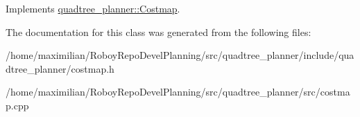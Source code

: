 Implements \hyperlink{classquadtree__planner_1_1Costmap_aba601c58933da74c707214d4dba2925a}{quadtree\+\_\+planner\+::\+Costmap}.



The documentation for this class was generated from the following files\+:\begin{DoxyCompactItemize}
\item 
/home/maximilian/\+Roboy\+Repo\+Devel\+Planning/src/quadtree\+\_\+planner/include/quadtree\+\_\+planner/costmap.\+h\item 
/home/maximilian/\+Roboy\+Repo\+Devel\+Planning/src/quadtree\+\_\+planner/src/costmap.\+cpp\end{DoxyCompactItemize}

